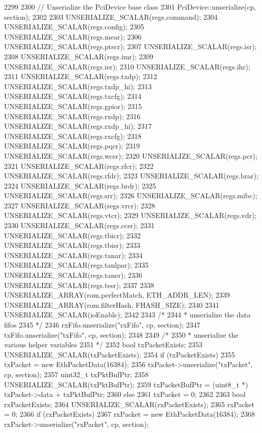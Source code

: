 \begin{DoxyCode}
2299 {
2300     // Unserialize the PciDevice base class
2301     PciDevice::unserialize(cp, section);
2302 
2303     UNSERIALIZE_SCALAR(regs.command);
2304     UNSERIALIZE_SCALAR(regs.config);
2305     UNSERIALIZE_SCALAR(regs.mear);
2306     UNSERIALIZE_SCALAR(regs.ptscr);
2307     UNSERIALIZE_SCALAR(regs.isr);
2308     UNSERIALIZE_SCALAR(regs.imr);
2309     UNSERIALIZE_SCALAR(regs.ier);
2310     UNSERIALIZE_SCALAR(regs.ihr);
2311     UNSERIALIZE_SCALAR(regs.txdp);
2312     UNSERIALIZE_SCALAR(regs.txdp_hi);
2313     UNSERIALIZE_SCALAR(regs.txcfg);
2314     UNSERIALIZE_SCALAR(regs.gpior);
2315     UNSERIALIZE_SCALAR(regs.rxdp);
2316     UNSERIALIZE_SCALAR(regs.rxdp_hi);
2317     UNSERIALIZE_SCALAR(regs.rxcfg);
2318     UNSERIALIZE_SCALAR(regs.pqcr);
2319     UNSERIALIZE_SCALAR(regs.wcsr);
2320     UNSERIALIZE_SCALAR(regs.pcr);
2321     UNSERIALIZE_SCALAR(regs.rfcr);
2322     UNSERIALIZE_SCALAR(regs.rfdr);
2323     UNSERIALIZE_SCALAR(regs.brar);
2324     UNSERIALIZE_SCALAR(regs.brdr);
2325     UNSERIALIZE_SCALAR(regs.srr);
2326     UNSERIALIZE_SCALAR(regs.mibc);
2327     UNSERIALIZE_SCALAR(regs.vrcr);
2328     UNSERIALIZE_SCALAR(regs.vtcr);
2329     UNSERIALIZE_SCALAR(regs.vdr);
2330     UNSERIALIZE_SCALAR(regs.ccsr);
2331     UNSERIALIZE_SCALAR(regs.tbicr);
2332     UNSERIALIZE_SCALAR(regs.tbisr);
2333     UNSERIALIZE_SCALAR(regs.tanar);
2334     UNSERIALIZE_SCALAR(regs.tanlpar);
2335     UNSERIALIZE_SCALAR(regs.taner);
2336     UNSERIALIZE_SCALAR(regs.tesr);
2337 
2338     UNSERIALIZE_ARRAY(rom.perfectMatch, ETH_ADDR_LEN);
2339     UNSERIALIZE_ARRAY(rom.filterHash, FHASH_SIZE);
2340 
2341     UNSERIALIZE_SCALAR(ioEnable);
2342 
2343     /*
2344      * unserialize the data fifos
2345      */
2346     rxFifo.unserialize("rxFifo", cp, section);
2347     txFifo.unserialize("txFifo", cp, section);
2348 
2349     /*
2350      * unserialize the various helper variables
2351      */
2352     bool txPacketExists;
2353     UNSERIALIZE_SCALAR(txPacketExists);
2354     if (txPacketExists) {
2355         txPacket = new EthPacketData(16384);
2356         txPacket->unserialize("txPacket", cp, section);
2357         uint32_t txPktBufPtr;
2358         UNSERIALIZE_SCALAR(txPktBufPtr);
2359         txPacketBufPtr = (uint8_t *) txPacket->data + txPktBufPtr;
2360     } else
2361         txPacket = 0;
2362 
2363     bool rxPacketExists;
2364     UNSERIALIZE_SCALAR(rxPacketExists);
2365     rxPacket = 0;
2366     if (rxPacketExists) {
2367         rxPacket = new EthPacketData(16384);
2368         rxPacket->unserialize("rxPacket", cp, section);
}}
\end{DoxyCode}

